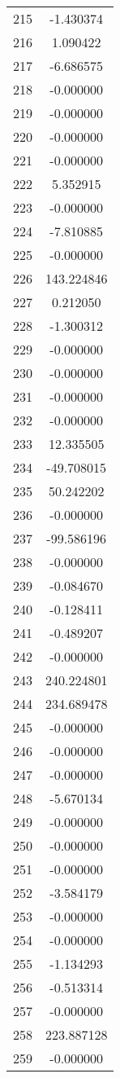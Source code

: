 \documentclass[12pt]{article}
\begin{document}
\begin{longtable}{@{}cc@{}}
215 & -1.430374 \\
216 & 1.090422 \\
217 & -6.686575 \\
218 & -0.000000 \\
219 & -0.000000 \\
220 & -0.000000 \\
221 & -0.000000 \\
222 & 5.352915 \\
223 & -0.000000 \\
224 & -7.810885 \\
225 & -0.000000 \\
226 & 143.224846 \\
227 & 0.212050 \\
228 & -1.300312 \\
229 & -0.000000 \\
230 & -0.000000 \\
231 & -0.000000 \\
232 & -0.000000 \\
233 & 12.335505 \\
234 & -49.708015 \\
235 & 50.242202 \\
236 & -0.000000 \\
237 & -99.586196 \\
238 & -0.000000 \\
239 & -0.084670 \\
240 & -0.128411 \\
241 & -0.489207 \\
242 & -0.000000 \\
243 & 240.224801 \\
244 & 234.689478 \\
245 & -0.000000 \\
246 & -0.000000 \\
247 & -0.000000 \\
248 & -5.670134 \\
249 & -0.000000 \\
250 & -0.000000 \\
251 & -0.000000 \\
252 & -3.584179 \\
253 & -0.000000 \\
254 & -0.000000 \\
255 & -1.134293 \\
256 & -0.513314 \\
257 & -0.000000 \\
258 & 223.887128 \\
259 & -0.000000 \\

\end{longtable}
\end{document}
